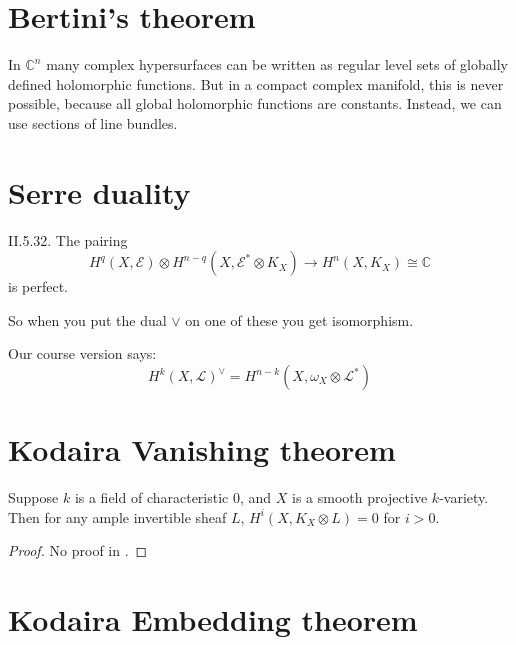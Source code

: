 \section{Bertini's theorem}
\label{section-Bertini-theorem}

\begin{slogan}
In \(\mathbb{C}^n\) many complex hypersurfaces can be written as regular level
sets of globally defined holomorphic functions. But in a compact complex
manifold, this is never possible, because all global holomorphic functions are
constants. Instead, we can use sections of line bundles.
\end{slogan}

\section{Serre duality}
\label{section-serre-duality}

\begin{theorem}
\label{theorem-serre-duality}
\cite{voi} II.5.32. The pairing
$$
H^q(X,\mathcal{E})\otimes
H^{n-q}(X,\mathcal{E}^*\otimes K_X)\to H^{n}(X,K_X)\cong\mathbb{C}
$$
is perfect.
\end{theorem}

So when you put the dual \(\vee\) on one of these you get isomorphism.

Our course version says:
$$
H^{k}(X,\mathcal{L})^{\vee}=H^{n-k}(X,\omega_X \otimes \mathcal{L}^*)
$$
\section{Kodaira Vanishing theorem}
\label{section-Kodaira-vanishing-theorem}

\begin{theorem}
\label{theorem-Kodaira-vanishing}
\begin{reference}
\cite[21.5.8]{sea}
\end{reference}
Suppose $k$ is a field of characteristic 0, and $X$ is a
smooth projective $k$-variety. Then for any ample invertible sheaf $L$,
$H^{i}(X,K_X \otimes L)=0$ for $i>0$.
\end{theorem}

\begin{proof}
No proof in \cite{sea}.
\end{proof}

\section{Kodaira Embedding theorem}
\label{section-Kodaira-Embedding-theorem}

